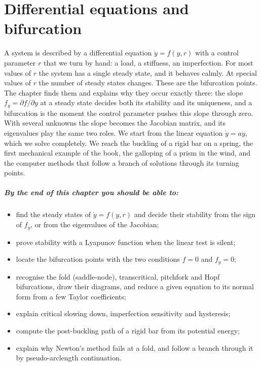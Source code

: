 \chapter{Differential equations and bifurcation}\label{ch:st}

A system is described by a differential equation $\dot y = f(y,r)$ with a
control parameter $r$ that we turn by hand: a load, a stiffness, an
imperfection. For most values of $r$ the system has a single steady state,
and it behaves calmly. At special values of $r$ the number of steady states
changes. These are the bifurcation points. The chapter finds them and explains
why they occur exactly there: the slope $f_y = \partial f/\partial y$ at a steady
state decides both its stability and its uniqueness, and a bifurcation is the
moment the control parameter pushes this slope through zero. With several
unknowns the slope becomes the Jacobian matrix, and its eigenvalues play the same
two roles. We start from the linear equation $\dot y = ay$, which we solve
completely. We reach the buckling of a rigid bar on a spring, the first mechanical
example of the book, the galloping of a prism in the wind, and the computer
methods that follow a branch of solutions through its turning points.

\paragraph{By the end of this chapter you should be able to:}
\begin{itemize}
  \item find the steady states of $\dot y = f(y,r)$ and decide their stability
        from the sign of $f_y$, or from the eigenvalues of the Jacobian;
  \item prove stability with a Lyapunov function when the linear test is silent;
  \item locate the bifurcation points with the two conditions $f = 0$ and $f_y = 0$;
  \item recognise the fold (saddle-node), transcritical, pitchfork and Hopf
        bifurcations, draw their diagrams, and reduce a given equation to its
        normal form from a few Taylor coefficients;
  \item explain critical slowing down, imperfection sensitivity and hysteresis;
  \item compute the post-buckling path of a rigid bar from its potential energy;
  \item explain why Newton's method fails at a fold, and follow a branch through
        it by pseudo-arclength continuation.
\end{itemize}

